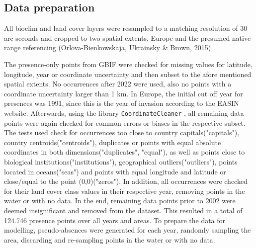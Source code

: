 \documentclass[12pt,a4paper]{article}
\begin{document}
\subsection{Data preparation} \label{ssec:datapreparation}
All bioclim and land cover layers were resampled to a matching resolution of 30 arc seconds and cropped to two spatial extents, Europe and the presumed native range referencing (Orlova-Bienkowskaja, Ukrainsky \& Brown, 2015) \autocite{orlova2015harmonia}.

The presence-only points from GBIF were checked for missing values for latitude, longitude, year or coordinate uncertainty and then subset to the afore mentioned spatial extents.
No occurrences after 2022 were used, also no points with a coordinate uncertainty larger than 1 km.
In Europe, the initial cut off year for presences was 1991, since this is the year of invasion according to the EASIN website.
Afterwards, using the library \texttt{CoordinateCleaner} \autocite{zizka2019coordinatecleaner}, all remaining data points were again checked for common errors or biases in the respective subset.
The tests used check for occurrences too close to country capitals("capitals"), country centroids("centroids"), duplicates or points with equal absolute coordinates in both dimensions("duplicates", "equal"), as well as points close to biological institutions("institutions"), geographical outliers("outliers"), points located in oceans("seas") and points with equal longitude and latitude or close/equal to the point (0,0)("zeros").
In addition, all occurrences were checked for their land cover class values in their respective year, removing points in the water or with no data.
In the end, remaining data points prior to 2002 were deemed insignificant and removed from the dataset.
This resulted in a total of 124.746 presence points over all years and areas.
To prepare the data for modelling, pseudo-absences were generated for each year, randomly sampling the area, discarding and re-sampling points in the water or with no data.
\end{document}
